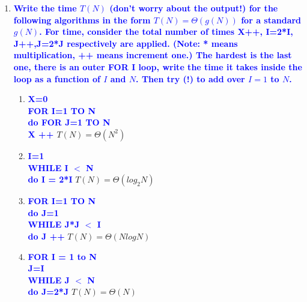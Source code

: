 \documentclass{article}
\begin{document}
\begin{enumerate}
\item \textbf{\textcolor{blue}{Write the time $T(N)$ (don't worry about the output!) for the following algorithms in the
form $T(N)=\Theta(g(N))$ for a standard $g(N)$.  
For time, consider the
total number of times X++, I=2*I, J++,J=2*J respectively are applied.
(Note: * means multiplication, ++ means increment one.)  The hardest is the last one,
there is an outer FOR I loop, write the time it takes inside the loop as a function of $I$ and $N$.
Then try (!) to add over $I=1$ to $N$.}}
    \begin{enumerate}
    \item \textbf{\textcolor{blue}{
    X=0
    \\ FOR I=1 TO N
    \\ \hspace*{1cm} do FOR J=1 TO N
    \\ \hspace*{2cm} X ++ }}
        \newline\newline $T(N)=\Theta(N^2)$
    \item \textbf{\textcolor{blue}{
    I=1
    \\ WHILE I $<$ N
    \\ \hspace*{1cm} do I = 2*I}}
        \newline\newline $T(N)=\Theta(log_2 N)$
    \item \textbf{\textcolor{blue}{
    FOR I=1 TO N
    \\ \hspace*{1cm} do J=1
    \\ \hspace*{1cm} WHILE J*J $<$ I
    \\ \hspace*{2cm} do J ++}}
        \newline\newline $T(N)=\Theta(N log N)$
    \item \textbf{\textcolor{blue}{
    FOR I = 1 to N
    \\ \hspace*{1cm} J=I
    \\ \hspace*{1cm} WHILE J $<$ N
    \\ \hspace*{2cm} do J=2*J}}
        \newline\newline $T(N)=\Theta(N)$
    \end{enumerate}

\end{enumerate}
\end{document}
